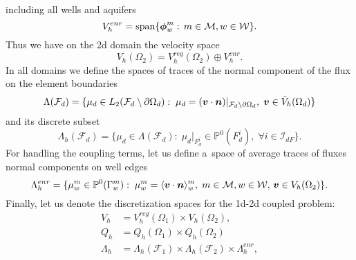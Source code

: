 including all wells and aquifers
\begin{equation}
    V^{enr}_h = \textrm{span}\{\mathbf{\boldsymbol{\phi}}^m_w:\, m\in\mathcal{M}, w\in\mathcal{W}\}.
\end{equation}
Thus we have on the 2d domain the velocity space
\begin{equation}
    V_h(\Omega_2) = V^{reg}_{h}(\Omega_2) \oplus V^{enr}_h.
\end{equation}
In all domains we define the spaces of traces of the normal component of the flux on the element boundaries
\begin{equation}
    \Lambda(\mathcal{F}_d) = \{\mu_d \in L_2(\mathcal{F}_d\setminus\partial\Omega_d):\;
        \mu_d=(\mathbf{\boldsymbol{v}}\cdot \mathbf{\boldsymbol{n}})|_{\mathcal{F}_d\setminus\partial\Omega_d},\; \mathbf{\boldsymbol{v}}\in \tilde V_h(\Omega_d)\}
\end{equation}
and its discrete subset
\begin{equation}
    \Lambda_h(\mathcal{F}_d) = \{\mu_d \in \Lambda(\mathcal{F}_d):\;
        \mu_d|_{F^i_d}\in\mathbb{P}^0(F^i_d),\; \forall i\in\mathcal{I}_{dF}\}.
\end{equation}
For handling the coupling terms, let us define a~space of average traces of fluxes normal components on well edges
\begin{equation} \label{eqn:lambda_w_space_2d}
    \Lambda^{enr}_h = \{\mu^m_w\in \mathbb P^0(\Gamma^m_w):\;
    \mu^m_w=\langle\mathbf{\boldsymbol{v}}\cdot \mathbf{\boldsymbol{n}}\rangle^m_w,\; m\in\mathcal{M}, w\in\mathcal{W},\, \mathbf{\boldsymbol{v}}\in V_h(\Omega_2)\}.
\end{equation}
%
Finally, let us denote the discretization spaces for the 1d-2d coupled problem:
\begin{align}
    V_h &= V^{reg}_h(\Omega_1) \times V_h(\Omega_2), \label{eqn:vel_h_space}\\
    Q_h &= Q_h(\Omega_1) \times Q_h(\Omega_2) \label{eqn:press_h_space} \\
    \Lambda_h &= \Lambda_h(\mathcal{F}_1)\times \Lambda_h(\mathcal{F}_2) \times \Lambda^{enr}_h, \label{eqn:lambda_h_space}
\end{align}

